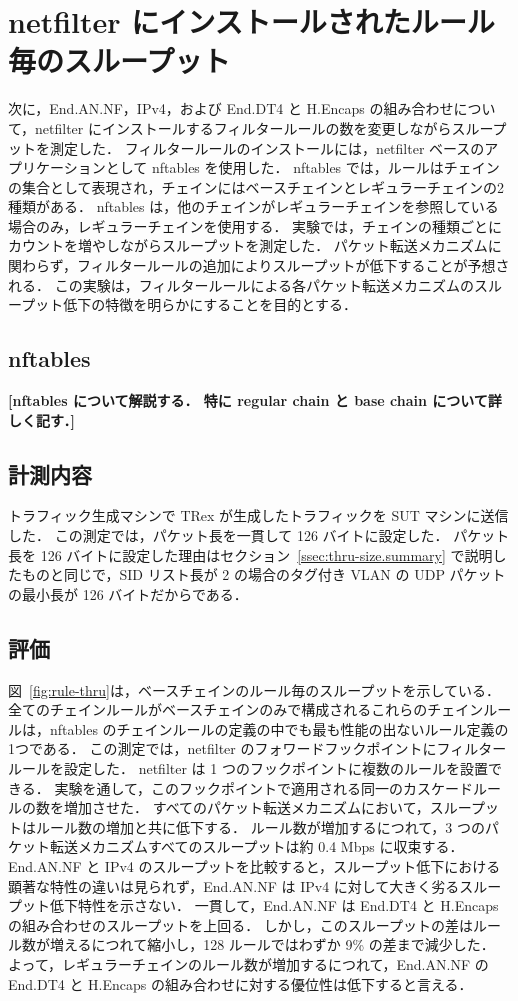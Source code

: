 \section{netfilter にインストールされたルール毎のスループット}
\label{sec:eval.thru-chains}
次に，End.AN.NF，IPv4，および End.DT4 と H.Encaps の組み合わせについて，netfilter にインストールするフィルタールールの数を変更しながらスループットを測定した．
フィルタールールのインストールには，netfilter ベースのアプリケーションとして nftables を使用した．
nftables では，ルールはチェインの集合として表現され，チェインにはベースチェインとレギュラーチェインの2種類がある．
nftables は，他のチェインがレギュラーチェインを参照している場合のみ，レギュラーチェインを使用する．
実験では，チェインの種類ごとにカウントを増やしながらスループットを測定した．
パケット転送メカニズムに関わらず，フィルタールールの追加によりスループットが低下することが予想される．
この実験は，フィルタールールによる各パケット転送メカニズムのスループット低下の特徴を明らかにすることを目的とする．

\subsection{nftables}
\label{ssec:thru-chains.nftables}
\textbf{[nftables について解説する． 特に regular chain と base chain について詳しく記す．]}


\subsection{計測内容}
\label{ssec:thru-chains.summary}
トラフィック生成マシンで TRex が生成したトラフィックを SUT マシンに送信した．
この測定では，パケット長を一貫して 126 バイトに設定した．
パケット長を 126 バイトに設定した理由はセクション~\ref{ssec:thru-size.summary} で説明したものと同じで，SID リスト長が 2 の場合のタグ付き VLAN の UDP パケットの最小長が 126 バイトだからである．

\subsection{評価}
\label{ssec:thru-chains.eval}
図~\ref{fig:rule-thru}は，ベースチェインのルール毎のスループットを示している．
全てのチェインルールがベースチェインのみで構成されるこれらのチェインルールは，nftables のチェインルールの定義の中でも最も性能の出ないルール定義の1つである．
この測定では，netfilter のフォワードフックポイントにフィルタールールを設定した．
netfilter は 1 つのフックポイントに複数のルールを設置できる．
実験を通して，このフックポイントで適用される同一のカスケードルールの数を増加させた．
すべてのパケット転送メカニズムにおいて，スループットはルール数の増加と共に低下する．
ルール数が増加するにつれて，3 つのパケット転送メカニズムすべてのスループットは約 0.4 Mbps に収束する．
End.AN.NF と IPv4 のスループットを比較すると，スループット低下における顕著な特性の違いは見られず，End.AN.NF は IPv4 に対して大きく劣るスループット低下特性を示さない．
一貫して，End.AN.NF は End.DT4 と H.Encaps の組み合わせのスループットを上回る．
しかし，このスループットの差はルール数が増えるにつれて縮小し，128 ルールではわずか 9\% の差まで減少した．
よって，レギュラーチェインのルール数が増加するにつれて，End.AN.NF の End.DT4 と H.Encaps の組み合わせに対する優位性は低下すると言える．

